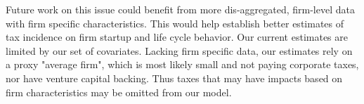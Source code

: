 Future work on this issue could benefit from more dis-aggregated, firm-level data with firm specific characteristics. This would help establish better estimates of tax incidence on firm startup and life cycle behavior. Our current estimates are limited by our set of covariates. Lacking firm specific data, our estimates rely on a proxy "average firm", which is most likely small and not paying corporate taxes, nor have venture capital backing. Thus taxes that may have impacts based on firm characteristics may be omitted from our model.
